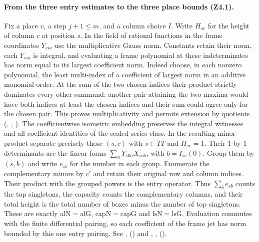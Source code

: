 \paragraph{From the three entry estimates to the three place bounds (Z4.1).}
\label{par:r5-z41-bridge}
Fix a place $v$, a step $j+1\le m$, and a column choice $I$. Write
$H_{sc}$ for the height of column $c$ at position $s$.
In the field of rational functions in the frame coordinates $Y_{sia}$
use the multiplicative Gauss norm. Constants retain their norm,
each $Y_{sia}$ is integral, and evaluating a frame polynomial at these
indeterminates has norm equal to its largest coefficient norm. Indeed choose, in each nonzero polynomial, the least multi-index of a
coefficient of largest norm in an additive monomial order. At the sum
of the two chosen indices their product strictly dominates every
other summand: another pair attaining the two maxima would have both
indices at least the chosen indices and their sum could agree only for
the chosen pair. This proves multiplicativity and permits extension by
quotients (, ,
). The
coefficientwise isometric embedding preserves the integral witnesses and
all coefficient identities of the scaled series class. In the resulting
minor product separate precisely those $(s,c)$ with $s\in TT$ and
$H_{sc}=1$. Their $1$-by-$1$ determinants are the linear forms
$\sum_aY_{s0a}X_{sa b}$, with $b=I_{sc}(0)$. Group them by $(s,b)$
and write $e_{sb}$ for the number in each group. Enumerate the
complementary minors by $c'$ and retain their original row and column
indices. Their product with the grouped powers is the entry operator.
Thus $\sum_b e_{sb}$ counts the top singletons, the capacity counts the
complementary columns, and their total height is the total number of
boxes minus the number of top singletons. These are exactly
$\mathrm{alN}=\mathrm{alG}$, $\mathrm{capN}=\mathrm{capG}$ and
$\mathrm{lsN}=\mathrm{lsG}$. Evaluation commutes with the finite
differential pairing, so each coefficient of the frame jet has norm
bounded by this one entry pairing. See ,
()
and , ,
().


